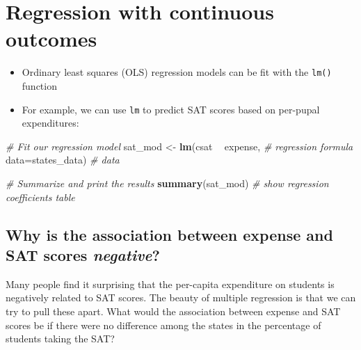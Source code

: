 \documentclass[]{book}
\newenvironment{Shaded}{\begin{snugshade}}{\end{snugshade}}
\newcommand{\KeywordTok}[1]{\textcolor[rgb]{0.13,0.29,0.53}{\textbf{#1}}}
\newcommand{\DataTypeTok}[1]{\textcolor[rgb]{0.13,0.29,0.53}{#1}}
\newcommand{\StringTok}[1]{\textcolor[rgb]{0.31,0.60,0.02}{#1}}
\newcommand{\CommentTok}[1]{\textcolor[rgb]{0.56,0.35,0.01}{\textit{#1}}}
\newcommand{\OperatorTok}[1]{\textcolor[rgb]{0.81,0.36,0.00}{\textbf{#1}}}
\newcommand{\NormalTok}[1]{#1}
\providecommand{\tightlist}{%
  \setlength{\itemsep}{0pt}\setlength{\parskip}{0pt}}
\begin{document}
\section{Regression with continuous
outcomes}\label{regression-with-continuous-outcomes}

\begin{itemize}
\tightlist
\item
  Ordinary least squares (OLS) regression models can be fit with the
  \texttt{lm()} function
\item
  For example, we can use \texttt{lm} to predict SAT scores based on
  per-pupal expenditures:
\end{itemize}

\begin{Shaded}
\begin{Highlighting}[]
  \CommentTok{# Fit our regression model}
\NormalTok{  sat_mod <-}\StringTok{ }\KeywordTok{lm}\NormalTok{(csat }\OperatorTok{~}\StringTok{ }\NormalTok{expense, }\CommentTok{# regression formula}
                \DataTypeTok{data=}\NormalTok{states_data) }\CommentTok{# data }
                
  \CommentTok{# Summarize and print the results}
  \KeywordTok{summary}\NormalTok{(sat_mod) }\CommentTok{# show regression coefficients table}
\end{Highlighting}
\end{Shaded}

\subsection{\texorpdfstring{Why is the association between expense and
SAT scores
\emph{negative}?}{Why is the association between expense and SAT scores negative?}}\label{why-is-the-association-between-expense-and-sat-scores-negative}

Many people find it surprising that the per-capita expenditure on
students is negatively related to SAT scores. The beauty of multiple
regression is that we can try to pull these apart. What would the
association between expense and SAT scores be if there were no
difference among the states in the percentage of students taking the
SAT?

\begin{Shaded}
\end{Shaded}
\end{document}
